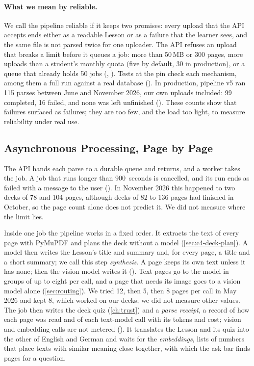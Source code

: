 \paragraph{What we mean by reliable.} We call the pipeline reliable if it
keeps two promises: every upload that the API accepts ends either as a
readable Lesson or as a failure that the learner sees, and the same file is
not parsed twice for one uploader. The API refuses an upload that breaks a
limit before it queues a job: more than 50\,MB or 300 pages, more uploads than
a student's monthly quota (five by default, 30 in production), or a queue that
already holds 50 jobs
(, ).
Tests at the pin check each mechanism, among them a full run against a real
database (). In production, pipeline v5
ran 115 parses between June and November 2026, our own uploads included: 99
completed, 16 failed, and none was left unfinished
().
These counts show that failures surfaced as failures; they are too few, and
the load too light, to measure reliability under real use.

\subsection{Asynchronous Processing, Page by Page}
\label{sec:async}

The API hands each parse to a durable queue and returns, and a worker takes
the job. A job that runs longer than 900~seconds is cancelled, and its run
ends as failed with a message to the user (). In
November 2026 this happened to two decks of 78 and 104 pages, although decks
of 82 to 136 pages had finished in October, so the page count alone does not
predict it. We did not measure where the limit lies.

Inside one job the pipeline works in a fixed order. It extracts the text of
every page with PyMuPDF and plans the deck without a model
(\cref{sec:c4-deck-plan}). A model then writes the Lesson's title and summary
and, for every page, a title and a short summary; we call this step
\emph{synthesis}. A page keeps its own text unless it has none; then the
vision model writes it (). Text pages
go to the model in groups of up to eight per call, and a page that needs its
image goes to a vision model alone (\cref{sec:routing}). We tried 12, then
5, then 8 pages per call in May 2026 and kept 8, which worked on our decks; we
did not measure other values. The job then writes the deck quiz
(\cref{ch:trust}) and a \emph{parse receipt}, a record of how each page was
read and of each text-model call with its tokens and cost; vision and
embedding calls are not metered (). It
translates the Lesson and its quiz into the other of English and German and
waits for the \emph{embeddings}, lists of numbers that place texts with
similar meaning close together, with which the ask bar finds pages for a
question.

